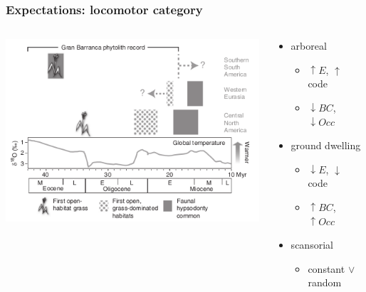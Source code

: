 \documentclass{beamer} \usepackage{amsmath,amsthm}
\begin{document}
\begin{frame}
  \frametitle{Expectations: locomotor category}

  \begin{columns}
    \begin{column}{0.6\textwidth}
      \includegraphics[height=0.8\textheight,width=\textwidth,keepaspectratio=true]{figure/stromberg}

      \tiny{}
    \end{column}
    \begin{column}{0.4\textwidth}
      \begin{itemize}
        \item arboreal
          \begin{itemize}
            \item \(\uparrow E\), \(\uparrow\) code
            \item \(\downarrow BC\), \(\downarrow Occ\)
          \end{itemize}
        \item ground dwelling
          \begin{itemize}
            \item \(\downarrow E\), \(\downarrow\) code
            \item \(\uparrow BC\), \(\uparrow Occ\)
          \end{itemize}
        \item scansorial
          \begin{itemize}
            \item constant \(\lor\) random
          \end{itemize}
      \end{itemize}
    \end{column}
  \end{columns}
\end{frame}
\end{document}
